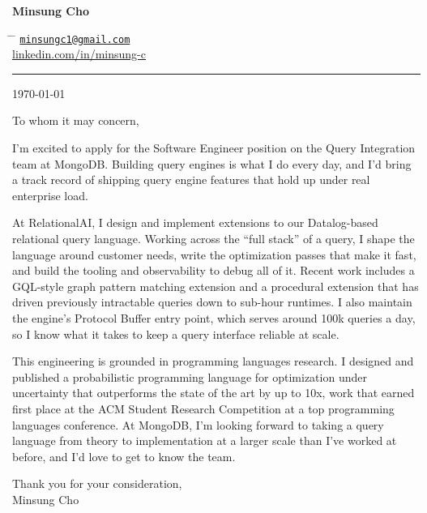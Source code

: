 \documentclass[11pt]{article}
\newcommand{\company}{MongoDB}
\newcommand{\role}{Software Engineer}
\newcommand{\greeting}{To whom it may concern}
\begin{document}
\parbox{0.5\textwidth}{
\huge{\textbf{Minsung Cho}}
}
\hfill
\parbox{0.5\textwidth}{
\begin{tabbing}
\hspace{3cm} \= \hspace{4cm} \= \kill
\href{mailto:minsungc1@gmail.com}{\texttt{minsungc1@gmail.com}} \\
\href{https://linkedin.com/in/minsung-c}{linkedin.com/in/minsung-c}
\end{tabbing}}

\hrule
\vspace{1.5em}

\today

\vspace{1em}

\noindent \greeting{},

I'm excited to apply for the \role{} position on the Query Integration team at \company{}.
Building query engines is what I do every day, and I'd bring a track record of shipping
query engine features that hold up under real enterprise load.

At RelationalAI, I design and implement extensions to our Datalog-based relational query
language. Working across the ``full stack'' of a query, I shape the language around customer
needs, write the optimization passes that make it fast, and build the tooling and
observability to debug all of it. Recent work includes a GQL-style graph pattern matching
extension and a procedural extension that has driven previously intractable queries down to
sub-hour runtimes. I also maintain the engine's Protocol Buffer entry point, which serves
around 100k queries a day, so I know what it takes to keep a query interface reliable at scale.

This engineering is grounded in programming languages research. I designed and published a
probabilistic programming language for optimization under uncertainty that
outperforms the state of the art by up to 10x, work that earned first place at the ACM
Student Research Competition at a top programming languages conference. At \company{}, I'm looking forward to taking a
 query
language from theory to implementation at a larger scale than I've worked at before, and I'd
love to get to know the team.

\vspace{1em}

\noindent Thank you for your consideration, \\
Minsung Cho
\end{document}
